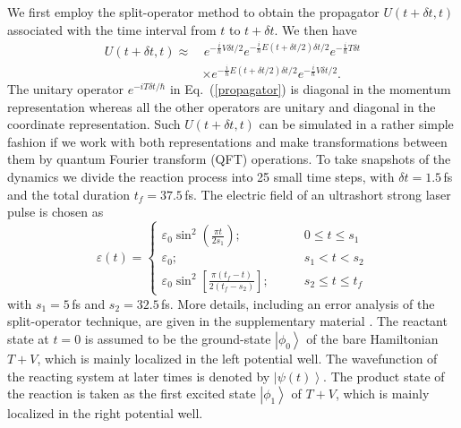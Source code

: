 \documentclass[prl,twocolumn,showpacs]{revtex4}
\newcommand{\be}{\begin{equation}}
\newcommand{\ee}{\end{equation}}
\newcommand{\nl}{\nonumber \\}
\begin{document}
We first employ the split-operator method \cite{split,dynamical} to obtain the
propagator $ {U}(t+\delta t,t)$ associated with the time interval from $t$ to $t+\delta t$.  We then have
\begin{align}\label{propagator}
 {U}(t+\delta t,t)\approx &\,
 e^{-\frac{i}{\hbar} {V} \delta t/2} e^{-\frac{i}{\hbar} {E} (t+\delta t/2)  \delta t/2}
 e^{-\frac{i}{\hbar} {T} \delta t}   \nl & \times e^{-\frac{i}{\hbar} {E} (t+\delta t/2)           \delta t/2}
 e^{-\frac{i}{\hbar} {V} \delta t/2} .
\end{align}
The unitary operator $e^{-i {T}\delta t/\hbar}$ in Eq.~(\ref{propagator}) is diagonal in the momentum representation whereas all the other operators
are unitary and diagonal in the coordinate representation. Such $ {U}(t+\delta t,t)$ can be simulated in a rather simple fashion
if we work with both representations and make transformations between them by quantum Fourier transform (QFT) operations.
To take snapshots of the dynamics we divide
the reaction process into 25 small time steps,
with $\delta t=1.5\,$fs and the total duration $t_f=37.5\,$fs.
The electric field of an ultrashort strong laser pulse is chosen as
\be
  \varepsilon(t)=\left\{
    \begin{array}{cc}
       \varepsilon_0\sin^2(\frac{\pi t}     {2s_1})         ;&\qquad   0\leq t\leq s_1\\
       \varepsilon_0                                        ;&\qquad   s_1<t<s_2\\
       \varepsilon_0\sin^2[\frac{\pi(t_f-t)}{2(t_f-s_2)}]   ;&\qquad   s_2\leq t\leq t_f
    \end{array}
  \right.
\ee
with $s_1=5\,$fs and $s_2=32.5\,$fs.
More details, including an error analysis of the split-operator technique, are given in the supplementary material \cite{supplement}.
The reactant state at $t=0$ is assumed to be
the ground-state $\left\vert \phi_{0} \right\rangle$ of the bare Hamiltonian $T+V$, which is mainly localized in the left potential well.
The wavefunction of the reacting system at later times is denoted by $\left\vert \psi({t}) \right\rangle$.
The product state of the reaction is taken as the first excited state $\left\vert \phi_{1} \right\rangle$ of $T+V$,
which is mainly localized in the right potential well.
\end{document}
